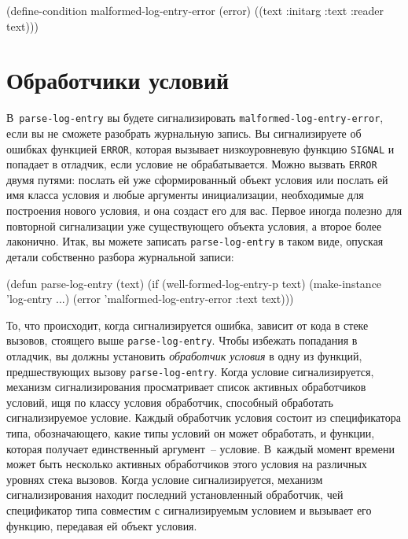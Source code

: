 \begin{myverb}
(define-condition malformed-log-entry-error (error)
  ((text :initarg :text :reader text)))
\end{myverb}

\section{Обработчики условий}

В~\lstinline{parse-log-entry} вы будете сигнализировать \lstinline{malformed-log-entry-error}, если
вы не сможете разобрать журнальную запись. Вы сигнализируете об ошибках функцией
\lstinline{ERROR}, которая вызывает низкоуровневую функцию \lstinline{SIGNAL} и попадает в отладчик,
если условие не обрабатывается. Можно вызвать \lstinline{ERROR} двумя путями: послать ей уже
сформированный объект условия или послать ей имя класса условия и любые аргументы
инициализации, необходимые для построения нового условия, и она создаст его для вас.
Первое иногда полезно для повторной сигнализации уже существующего объекта условия, а
второе более лаконично. Итак, вы можете записать \lstinline{parse-log-entry} в таком виде,
опуская детали собственно разбора журнальной записи:

\begin{myverb}
(defun parse-log-entry (text)
  (if (well-formed-log-entry-p text)
    (make-instance 'log-entry ...)
    (error 'malformed-log-entry-error :text text)))
\end{myverb}

То, что происходит, когда сигнализируется ошибка, зависит от кода в стеке вызовов,
стоящего выше \lstinline{parse-log-entry}. Чтобы избежать попадания в отладчик, вы должны
установить \textit{обработчик условия} в одну из функций, предшествующих вызову
\lstinline{parse-log-entry}. Когда условие сигнализируется, механизм сигнализирования
просматривает список активных обработчиков условий, ищя по классу условия обработчик,
способный обработать сигнализируемое условие. Каждый обработчик условия состоит из
спецификатора типа, обозначающего, какие типы условий он может обработать, и функции,
которая получает единственный аргумент~-- условие. В~каждый момент времени может быть
несколько активных обработчиков этого условия на различных уровнях стека вызовов. Когда
условие сигнализируется, механизм сигнализирования находит последний установленный
обработчик, чей спецификатор типа совместим с сигнализируемым условием и вызывает его
функцию, передавая ей объект условия.

